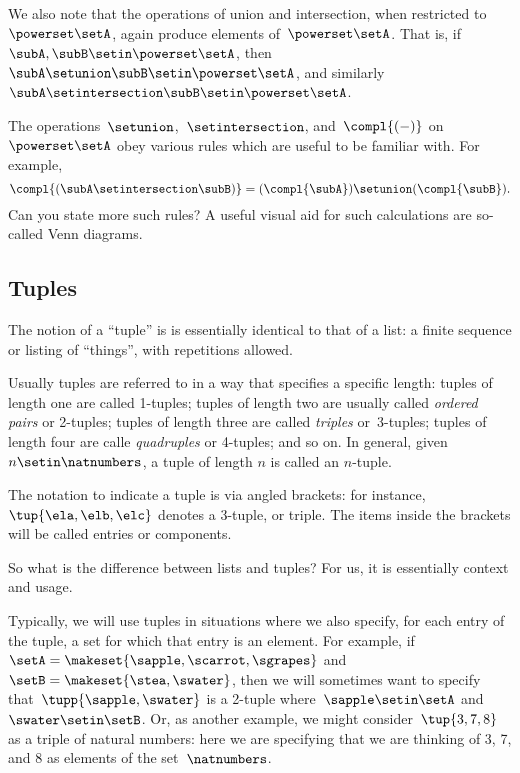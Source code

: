 We also note that the operations of union and intersection, when restricted to~$\powerset \setA$, again produce elements of~$\powerset \setA$.
That is, if~$\subA, \subB \setin\powerset \setA$, then~$\subA \setunion \subB \setin\powerset \setA$, and similarly~$\subA \setintersection \subB \setin\powerset \setA$.

The operations~$\setunion$,~$\setintersection$, and~$\compl{( - )}$ on~$\powerset \setA$ obey various rules which are useful to be familiar with.
For example,
\begin{equation*}
    \compl{(\subA \setintersection \subB)} = (\compl{\subA}) \setunion (\compl{\subB}).
\end{equation*}
Can you state more such rules?
A useful visual aid for such calculations are so-called Venn diagrams.


\subsection{Tuples}

The notion of a ``tuple'' is is essentially identical to that of a list: a finite sequence or listing of ``things'', with repetitions allowed.

Usually tuples are referred to in a way that specifies a specific length: tuples of length one are called 1-tuples; tuples of length two are usually called \emph{ordered pairs} or 2-tuples; tuples of length three are called \emph{triples} or~3-tuples; tuples of length four are calle \emph{quadruples} or 4-tuples; and so on.
In general, given~$n \setin\natnumbers$, a tuple of length $n$ is called an $n$-tuple.

The notation to indicate a tuple is via angled brackets: for instance,~$\tup{\ela, \elb, \elc}$ denotes a 3-tuple, or triple.
The items inside the brackets will be called entries or components.

So what is the difference between lists and tuples?
For us, it is essentially context and usage.

Typically, we will use tuples in situations where we also specify, for each entry of the tuple, a set for which that entry is an element.
For example, if~$\setA = \makeset{ \sapple, \scarrot, \sgrapes}$ and~$\setB = \makeset{ \stea, \swater }$, then we will sometimes want to specify that~$\tupp{\sapple, \swater}$ is a 2-tuple where~$\sapple \setin\setA$ and~$\swater \setin\setB$.
Or, as another example, we might consider~$\tup{3, 7, 8}$ as a triple of natural numbers: here we are specifying that we are thinking of 3, 7, and 8 as elements of the set~$\natnumbers$.

